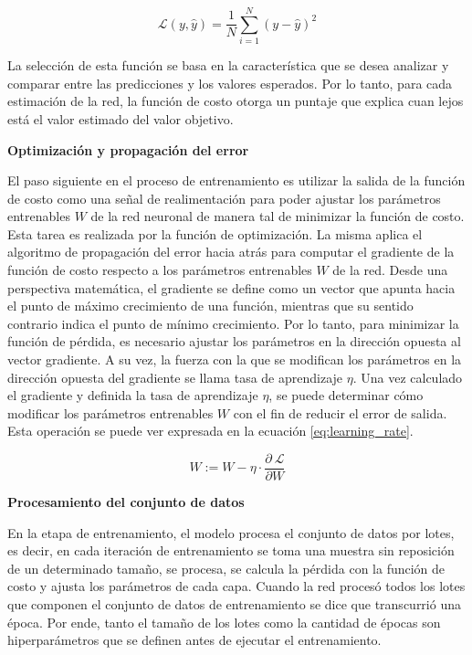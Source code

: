 \begin{equation}
    \mathcal{L}(y,\hat{y}) = \frac{1}{N}\sum \limits_{i=1}^{N} (y - \hat{y})^2
    \label{eq:mse}
\end{equation}

La selección de esta función se basa en la característica que se desea analizar y comparar entre las predicciones y los valores esperados. Por lo tanto, para cada estimación de la red, la función de costo otorga un puntaje que explica cuan lejos está el valor estimado del valor objetivo. 

{\large \textbf{Optimización y propagación del error}}

El paso siguiente en el proceso de entrenamiento es utilizar la salida de la función de costo como una señal de realimentación para poder ajustar los parámetros entrenables $W$ de la red neuronal de manera tal de minimizar la función de costo. Esta tarea es realizada por la función de optimización. La misma aplica el algoritmo de propagación del error hacia atrás para computar el gradiente de la función de costo respecto a los parámetros entrenables $W$ de la red. Desde una perspectiva matemática, el gradiente se define como un vector que apunta hacia el punto de máximo crecimiento de una función, mientras que su sentido contrario indica el punto de mínimo crecimiento. Por lo tanto, para minimizar la función de pérdida, es necesario ajustar los parámetros en la dirección opuesta al vector gradiente. A su vez, la fuerza con la que se modifican los parámetros en la dirección opuesta del gradiente se llama tasa de aprendizaje $\eta$. Una vez calculado el gradiente y definida la tasa de aprendizaje $\eta$, se puede determinar cómo modificar los parámetros entrenables $W$ con el fin de reducir el error de salida. Esta operación se puede ver expresada en la ecuación \eqref{eq:learning_rate}.

\begin{equation}
    W := W - \eta \cdot \frac{\partial ~\mathcal{L}}{\partial W}
    \label{eq:learning_rate}
\end{equation}

{\large \textbf{Procesamiento del conjunto de datos}}

En la etapa de entrenamiento, el modelo procesa el conjunto de datos por lotes, es decir, en cada iteración de entrenamiento se toma una muestra sin reposición de un determinado tamaño, se procesa, se calcula la pérdida con la función de costo y
ajusta los parámetros de cada capa. Cuando la red procesó todos los lotes que componen el conjunto de datos de entrenamiento se dice que transcurrió una época. Por ende, tanto el tamaño de los lotes como la cantidad de épocas son hiperparámetros que se definen antes de ejecutar el entrenamiento.

